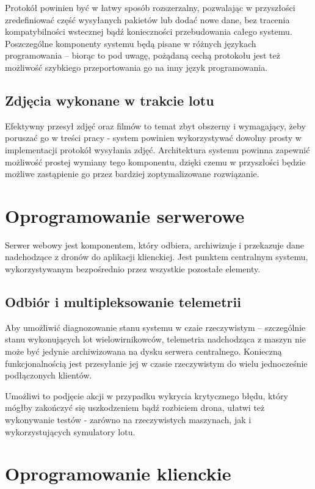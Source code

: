 Protokół powinien być w łatwy sposób rozszerzalny,
pozwalając w przyszłości zredefiniować część wysyłanych
pakietów lub dodać nowe dane, bez tracenia kompatybilności
wstecznej bądź konieczności przebudowania całego systemu.
Poszczególne komponenty systemu będą pisane w różnych
językach programowania -- biorąc to pod uwagę, pożądaną
cechą protokołu jest też możliwość szybkiego przeportowania
go na inny język programowania. 

\subsection{Zdjęcia wykonane w trakcie lotu}
Efektywny przesył zdjęć oraz filmów to temat zbyt obszerny
i wymagający, żeby poruszać go w treści pracy - system
powinien wykorzystywać dowolny prosty w implementacji
protokół wysyłania zdjęć. Architektura systemu powinna
zapewnić możliwość prostej wymiany tego komponentu, dzięki
czemu w przyszłości będzie możliwe zastąpienie go
przez bardziej zoptymalizowane rozwiązanie.

\section{Oprogramowanie serwerowe}

Serwer webowy jest komponentem, który odbiera, archiwizuje i przekazuje
dane nadchodzące z dronów do aplikacji klienckiej. Jest punktem centralnym systemu,
wykorzystywanym bezpośrednio przez wszystkie pozostałe elementy.

\subsection{Odbiór i multipleksowanie telemetrii}

Aby umożliwić diagnozowanie stanu systemu w czaie rzeczywistym -- szczególnie
stanu wykonujących lot wielowirnikowców, telemetria nadchodząca z maszyn nie może być
jedynie archiwizowana na dysku serwera centralnego. Konieczną funkcjonalnością jest
przesyłanie jej w czasie rzeczywistym do wielu jednocześnie podłączonych klientów.

Umożliwi to podjęcie akcji w przypadku wykrycia krytycznego błędu, który mógłby
zakończyć się uszkodzeniem bądź rozbiciem drona, ułatwi też wykonywanie testów - zarówno
na rzeczywistych maszynach, jak i wykorzystujących symulatory lotu.

\section{Oprogramowanie klienckie}

